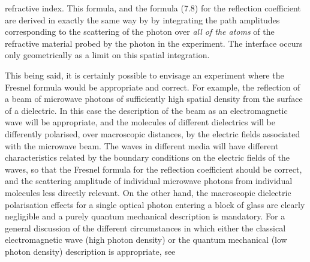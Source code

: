 \documentclass [12pt]{article}
\begin{document}
{   refractive index. This formula, and the formula (7.8) for the reflection coefficient
  are derived in exactly the same way by by integrating the path amplitudes corresponding
   to the scattering of the photon over {\it all of the atoms} of the refractive
   material probed by the photon in the experiment. The interface occurs only geometrically
  as a limit on this spatial integration.
  \par  This being said, it is certainly possible to envisage an experiment where the Fresnel
  formula would be appropriate and correct. For example, the reflection of a beam
   of microwave photons of sufficiently high spatial density from the surface 
  of a dielectric. In this case the description of the beam as an electromagnetic wave will be 
  appropriate, and the molecules of different dielectrics will be differently polarised, over macroscopic
  distances,
  by the electric fields associated with the microwave beam. The waves in different media will
  have different characteristics related by the boundary conditions on the electric fields
  of the waves, so that the Fresnel formula for the reflection coefficient should be 
  correct, and the scattering amplitude of individual microwave photons from individual
  molecules less directly relevant. On the other hand, the macroscopic dielectric polarisation effects
  for a single optical photon entering a block of glass are clearly negligible and a purely
  quantum mechanical description is mandatory. For a general discussion of the different circumstances
  in which either the classical electromagnetic wave (high photon density) or the quantum
  mechanical (low photon density) description is appropriate, see ~\cite{JHF6}

}
\end{document}
